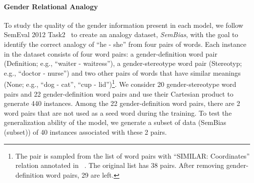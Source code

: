 \paragraph{Gender Relational Analogy} 
To study the quality of the gender information present in each model, we follow SemEval 2012 Task2~\cite{jurgens2012semeval} to create an analogy dataset, \textit{SemBias}, with the goal to identify the correct analogy of ``he - she'' from four pairs of words. Each instance in the dataset consists of four word pairs: a gender-definition word pair (Definition; e.g., ``waiter - waitress''), a gender-stereotype word pair (Stereotyp; e.g., ``doctor - nurse'') and two other pairs of words that have similar meanings (None; e.g.,  ``dog - cat'', ``cup - lid'')\footnote{The pair is sampled from the list of word pairs with ``SIMILAR: Coordinates'' relation annotated in ~\cite{jurgens2012semeval}. The original list has 38 pairs. After removing gender-definition word pairs, 29 are left.}. We consider 20 gender-stereotype word pairs and 22 gender-definition word pairs and use their Cartesian product to generate 440 instances. Among the 22 gender-definition word pairs, there are 2 word pairs that are not used as a seed word during the training. To test the generalization ability of the model, we generate a subset of data  (SemBias (subset)) of 40 instances associated with these 2 pairs.



